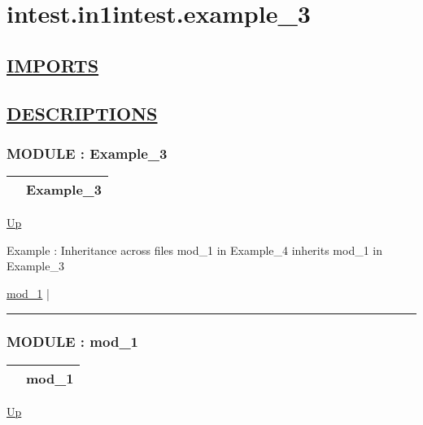 \chapter*{intest.in1intest.example\_3}
\hypertarget{ecldoc:toc:intest.in1intest.example_3}{}

\section*{\underline{IMPORTS}}

\section*{\underline{DESCRIPTIONS}}
\subsection*{MODULE : Example\_3}
\hypertarget{ecldoc:intest.in1intest.Example_3}{}

{\renewcommand{\arraystretch}{1.5}
\begin{tabularx}{\textwidth}{|>{\raggedright\arraybackslash}l|X|}
\hline
\hspace{0pt} & Example\_3 \\
\hline
\end{tabularx}
}

\hyperlink{ecldoc:toc:intest/in1intest}{Up}

\par
Example : Inheritance across files mod\_1 in Example\_4 inherits mod\_1 in Example\_3


\hyperlink{ecldoc:intest.in1intest.Example_3.mod_1}{mod\_1}  |

\rule{\textwidth}{0.4pt}

\subsection*{MODULE : mod\_1}
\hypertarget{ecldoc:intest.in1intest.Example_3.mod_1}{}

{\renewcommand{\arraystretch}{1.5}
\begin{tabularx}{\textwidth}{|>{\raggedright\arraybackslash}l|X|}
\hline
\hspace{0pt} & mod\_1 \\
\hline
\end{tabularx}
}

\hyperlink{ecldoc:intest.in1intest.Example_3}{Up}

\par


